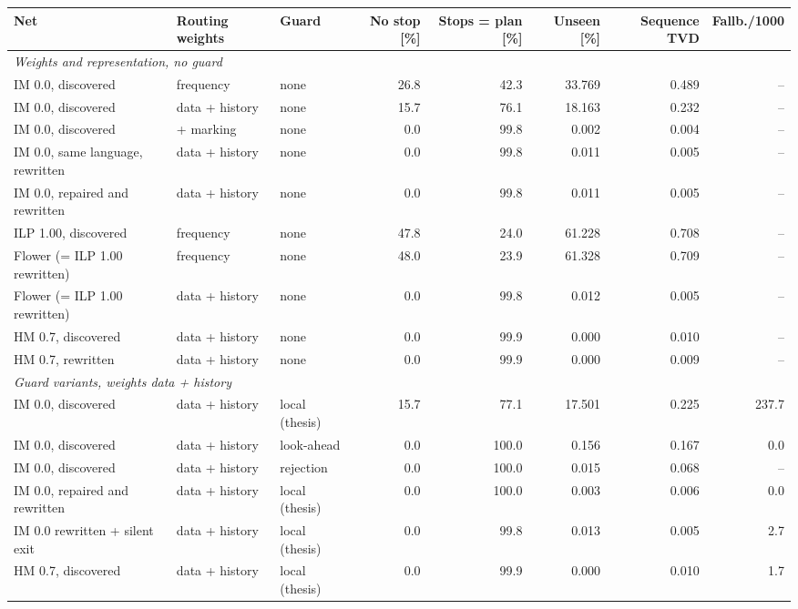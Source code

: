 \begin{table}[htbp]
\centering
\scriptsize
\setlength{\tabcolsep}{2.5pt}
\begin{tabular}{lllrrrrr}
\toprule
\textbf{Net} & \textbf{Routing weights} & \textbf{Guard} & \textbf{No stop [\%]} & \textbf{Stops = plan [\%]} & \textbf{Unseen [\%]} & \textbf{Sequence TVD} & \textbf{Fallb./1000} \\
\midrule
\multicolumn{8}{l}{\textit{Weights and representation, no guard}} \\
IM 0.0, discovered & frequency & none & 26.8 & 42.3 & 33.769 & 0.489 & -- \\
IM 0.0, discovered & data + history & none & 15.7 & 76.1 & 18.163 & 0.232 & -- \\
IM 0.0, discovered & + marking & none & 0.0 & 99.8 & 0.002 & 0.004 & -- \\
IM 0.0, same language, rewritten & data + history & none & 0.0 & 99.8 & 0.011 & 0.005 & -- \\
IM 0.0, repaired and rewritten & data + history & none & 0.0 & 99.8 & 0.011 & 0.005 & -- \\
ILP 1.00, discovered & frequency & none & 47.8 & 24.0 & 61.228 & 0.708 & -- \\
Flower (= ILP 1.00 rewritten) & frequency & none & 48.0 & 23.9 & 61.328 & 0.709 & -- \\
Flower (= ILP 1.00 rewritten) & data + history & none & 0.0 & 99.8 & 0.012 & 0.005 & -- \\
HM 0.7, discovered & data + history & none & 0.0 & 99.9 & 0.000 & 0.010 & -- \\
HM 0.7, rewritten & data + history & none & 0.0 & 99.9 & 0.000 & 0.009 & -- \\
\midrule
\multicolumn{8}{l}{\textit{Guard variants, weights data + history}} \\
IM 0.0, discovered & data + history & local (thesis) & 15.7 & 77.1 & 17.501 & 0.225 & 237.7 \\
IM 0.0, discovered & data + history & look-ahead & 0.0 & 100.0 & 0.156 & 0.167 & 0.0 \\
IM 0.0, discovered & data + history & rejection & 0.0 & 100.0 & 0.015 & 0.068 & -- \\
IM 0.0, repaired and rewritten & data + history & local (thesis) & 0.0 & 100.0 & 0.003 & 0.006 & 0.0 \\
IM 0.0 rewritten + silent exit & data + history & local (thesis) & 0.0 & 99.8 & 0.013 & 0.005 & 2.7 \\
HM 0.7, discovered & data + history & local (thesis) & 0.0 & 99.9 & 0.000 & 0.010 & 1.7 \\

\end{tabular}
\end{table}
